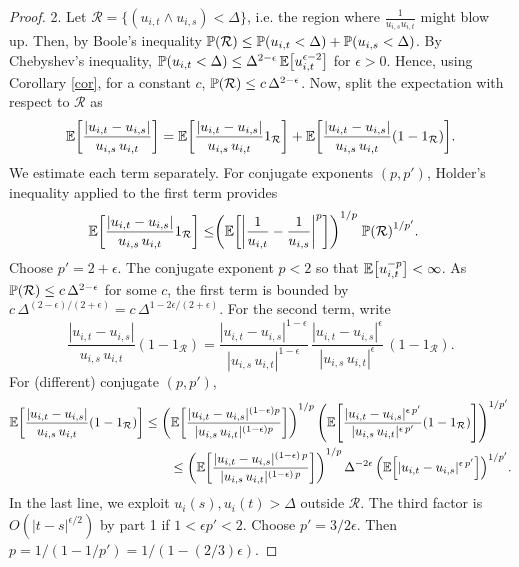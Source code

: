\documentclass[11pt, twoside]{report}
\begin{document}
\begin{proof}
2. Let $\mathcal R=\{ (u_{i,t}\wedge u_{i,s})<\Delta\}$, i.e. the region where $\frac{1}{u_{i,s}u_{i,t}}$ might blow up. Then, by Boole's inequality $\prob(\mathcal R) \le  \prob\pp{u_{i,t}<\Delta} +  \prob\pp{u_{i,s}<\Delta}$.  By Chebyshev's inequality, $\prob\pp{u_{i,t}<\Delta}\le  \Delta^{2-\epsilon}\, \mean{u_{i,t}^{\epsilon-2}}$ for $\epsilon>0$. Hence, using Corollary \ref{cor}, for a constant $c$, $\prob\pp{\mathcal R}\le c \,\Delta^{2-\epsilon}$. Now, split the expectation with respect to $\mathcal R$ as 
 \begin{equation}
     \mathbb{E} \bp{\frac {|u_{i,t}-u_{i,s}|}{u_{i,s}\,u_{i,t}}} 
     =   \mathbb{E} \bp{\frac {|u_{i,t}-u_{i,s}|}{u_{i,s}\,u_{i,t}}1_{\mathcal R}}
     +    \mathbb{E} \bp{\frac {|u_{i,t}-u_{i,s}|}{u_{i,s}\,u_{i,t}} (1-1_{\mathcal R})}.
 \end{equation}
 We estimate each term separately. For conjugate exponents $(p,p')$, Holder's inequality applied to the first term provides
 \begin{align*}
     \mathbb{E} \bp{\frac {|u_{i,t}-u_{i,s}|}{u_{i,s}\,u_{i,t}}1_{\mathcal R}}
  \le&     \pp{\mathbb{E} \bp{\abs{\frac 1 {u_{i,t}}-\frac1{u_{i,s}} }^p}
  }^{1/p}\;\prob\pp{\mathcal R}^{ 1/{p'}}. 
 \end{align*}
 Choose $p'=2+\epsilon$. The conjugate exponent $p<2$ so that  $\mean{u_{i,t}^{-p}}<\infty$. As $\mathbb{P}(\mathcal{R})\le c\, \Delta^{2-\epsilon}$ for some $c$, 
  the first term is bounded by $c\,\Delta^{
  (2-\epsilon)/(2+\epsilon)}= c\,\Delta^{1-2\epsilon/(2+\epsilon)}$. For the second term, write
  \[
     \frac {|u_{i,t}-u_{i,s}|}{u_{i,s}\,u_{i,t}} (1-1_{\mathcal R})
   =    \frac {|u_{i,t}-u_{i,s}|^{1-\epsilon}}{|u_{i,s}\,u_{i,t}|^{1-\epsilon}}\,\frac {|u_{i,t}-u_{i,s}|^{\epsilon}}{|u_{i,s}\,u_{i,t}|^{\epsilon}}\,
   (1-1_{\mathcal R}).
   \]
For (different) conjugate $(p,p')$,
 \begin{align*}
  \mathbb{E} \bp{\frac {|u_{i,t}-u_{i,s}|}{u_{i,s}\,u_{i,t}} (1-1_{\mathcal R})} & \le \pp{  \mathbb{E} \bp{\frac {|u_{i,t}-u_{i,s}|^{(1-\epsilon)p}}{|u_{i,s}\,u_{i,t}|^{(1-\epsilon)p}}}}^{1/p}\,\pp{ \mathbb{E} \bp{\frac {|u_{i,t}-u_{i,s}|^{\epsilon\,p'}}{|u_{i,s}\,u_{i,t}|^{\epsilon\,p'}}(1-1_{\mathcal R})}}^{1/p'}\\
&\qquad     \le  \pp{\mathbb{E} \bp{\frac {|u_{i,t}-u_{i,s}|^{(1-\epsilon)\,p}}{|u_{i,s}\,u_{i,t}|^{(1-\epsilon)\,p}}}}^{1/p}\, \Delta^{-2\epsilon
     }\,\pp{\mathbb{E} \bp{ {|u_{i,t}-u_{i,s}|^{\epsilon\, p'}}}}^{1/p'}.
   \end{align*}
In the last line, we exploit  $u_i(s),u_i(t)>\Delta$ outside $\mathcal R$.
The third factor is $O(|t-s|^{\epsilon/2})$ by part 1 if $1<\epsilon p'<2$. Choose $p'=3/2\epsilon$. Then $p=1/(1-1/p')=1/(1-(2/3)\epsilon)$.


\end{proof}
\end{document}
